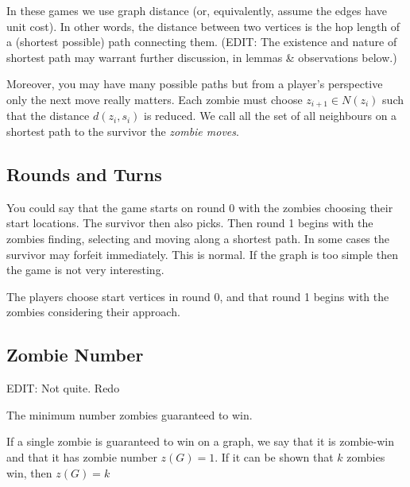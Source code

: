 In these games we use graph distance (or, equivalently, assume the edges have unit cost).
In other words, the distance between two vertices is the hop length of a (shortest possible) path
connecting them.
(EDIT: The existence and nature of shortest path may warrant further discussion, in lemmas \& observations below.)

Moreover, you may have many possible paths but from a player's perspective only the
next move really matters. Each zombie must choose $z_{i+1} \in N(z_i)$ such that
the distance $d(z_i, s_i)$ is reduced. We call all the set of all neighbours on
a shortest path to the survivor the \textit{zombie moves}.

\subsection{Rounds and Turns}
You could say that the game starts on round 0 with the zombies choosing their
start locations. The survivor then also picks. Then round 1 begins with the
zombies finding, selecting and moving along a shortest path. In some cases the survivor
may forfeit immediately. This is normal. If the graph is too simple
then the game is not very interesting.

The players choose start vertices in round 0, and that round 1
begins with the zombies considering their approach.


\subsection{Zombie Number}

EDIT: Not quite. Redo

The minimum number zombies guaranteed to win.

If a single zombie is guaranteed to win on a graph, we say that it is zombie-win
and that it has zombie number $z(G) = 1$. If it can be shown that $k$ zombies win,
then $z(G) = k$

